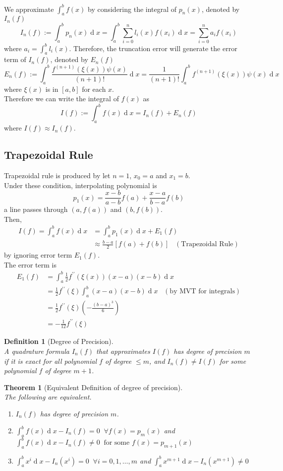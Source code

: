 \documentclass[12pt]{article}
\newtheorem{definition}{Definition}[section]
\newtheorem{theorem}{Theorem}[section]
\theoremstyle{definition}
\DeclareMathOperator{\diff}{d}
\begin{document}
We approximate $\int_a^b f(x)$ by considering the integral of $p_n(x)$, denoted by $I_n(f)$
\[
I_n(f):=\int_a^b p_n(x)\diff x = \int_a^b\sum_{i=0}^n l_i(x)f(x_i)\diff x = \sum_{i=0}^n a_if(x_i)
\]
where $a_i = \int_a^b l_i(x)$.
Therefore, the truncation error will generate the error term of $I_n(f)$, denoted by $E_n(f)$
\[
E_n(f):=\int_a^b \frac{f^{(n+1)}(\xi(x))\psi(x)}{(n+1)!}\diff x = \frac{1}{(n+1)!}\int_a^b f^{(n+1)}(\xi(x))\psi(x)\diff x
\]
where $\xi(x)$ is in $[a,b]$ for each $x$. \\Therefore we can write the integral of $f(x)$ as
\[
I(f):=\int_a^b f(x)\diff x = I_n(f)+E_n(f)
\]
where $I(f)\approx I_n(f)$.
\subsection{Trapezoidal Rule}
Trapezoidal rule is produced by let $n=1$, $x_0 = a$ and $x_1=b$. \\Under these condition, interpolating polynomial is
\[
p_1(x) = \frac{x-b}{a-b}f(a)+\frac{x-a}{b-a}f(b)
\]
a line passes through $(a,f(a))$ and $(b,f(b))$.\\ Then,
\begin{align*}
I(f)=\int_a^bf(x)\diff x &= \int_a^b p_1(x)\diff x +E_1(f)\\
&\approx \frac{b-a}{2}[f(a)+f(b)]\;\;\;(\text{Trapezoidal Rule})
\end{align*}
by ignoring error term $E_1(f)$.\\The error term is
\begin{align*}
E_1(f)&=\int_a^b\frac{1}{2}f^{\prime\prime}(\xi(x))(x-a)(x-b)\diff x\\
&= \frac{1}{2}f^{\prime\prime}(\xi)\int_a^b (x-a)(x-b)\diff x\;\;\;(\text{by MVT for integrals})\\
&=\frac{1}{2}f^{\prime\prime}(\xi)\left(-\frac{(b-a)^3}{6}\right)\\
&=-\frac{1}{12}f^{\prime\prime}(\xi)
\end{align*}
\begin{definition}[Degree of Precision]
\hfill\\\normalfont A quadrature formula $I_n(f)$ that approximates $I(f)$ has degree of precision $m$ if it is exact for all polynomial $f$ of degree $\leq m$, and $I_n(f)\neq I(f)$ for some polynomial $f$ of degree $m+1$.
\end{definition}
\begin{theorem}[Equivalent Definition of degree of precision]
\hfill\\\normalfont The following are equivalent.
\begin{enumerate}
  \item $I_n(f)$ has degree of precision $m$.
  \item $\int_a^b f(x)\diff x -I_n(f)=0\;\;\forall f(x)=p_m(x)$ and
  $\int_a^b f(x)\diff x -I_n(f)\neq 0\;\;\text{for some }f(x)=p_{m+1}(x)$
  \item $\int_a^b x^i\diff x-I_n(x^i)=0\;\;\forall i = 0,1,\ldots, m$ and
  $\int_a^b x^{m+1}\diff x -I_n(x^{m+1})\neq 0$ 
\end{enumerate}
\end{theorem}
\end{document}
